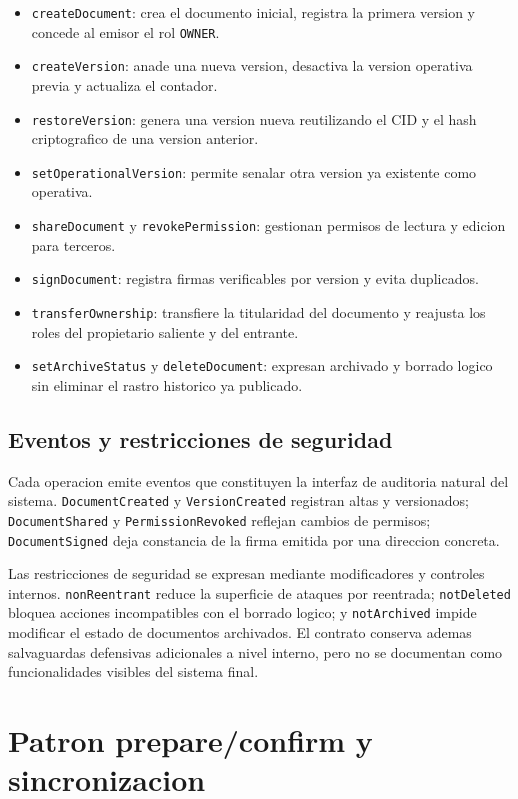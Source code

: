 \documentclass[11pt, a4paper]{article}
\begin{document}
\begin{itemize}
    \item \texttt{createDocument}: crea el documento inicial, registra la primera version y concede al emisor el rol \texttt{OWNER}.
    \item \texttt{createVersion}: anade una nueva version, desactiva la version operativa previa y actualiza el contador.
    \item \texttt{restoreVersion}: genera una version nueva reutilizando el CID y el hash criptografico de una version anterior.
    \item \texttt{setOperationalVersion}: permite senalar otra version ya existente como operativa.
    \item \texttt{shareDocument} y \texttt{revokePermission}: gestionan permisos de lectura y edicion para terceros.
    \item \texttt{signDocument}: registra firmas verificables por version y evita duplicados.
    \item \texttt{transferOwnership}: transfiere la titularidad del documento y reajusta los roles del propietario saliente y del entrante.
    \item \texttt{setArchiveStatus} y \texttt{deleteDocument}: expresan archivado y borrado logico sin eliminar el rastro historico ya publicado.
\end{itemize}

\subsection{Eventos y restricciones de seguridad}

Cada operacion emite eventos que constituyen la interfaz de auditoria natural del sistema. \texttt{DocumentCreated} y \texttt{VersionCreated} registran altas y versionados; \texttt{DocumentShared} y \texttt{PermissionRevoked} reflejan cambios de permisos; \texttt{DocumentSigned} deja constancia de la firma emitida por una direccion concreta.

Las restricciones de seguridad se expresan mediante modificadores y controles internos. \texttt{nonReentrant} reduce la superficie de ataques por reentrada; \texttt{notDeleted} bloquea acciones incompatibles con el borrado logico; y \texttt{notArchived} impide modificar el estado de documentos archivados. El contrato conserva ademas salvaguardas defensivas adicionales a nivel interno, pero no se documentan como funcionalidades visibles del sistema final.

\section{Patron prepare/confirm y sincronizacion}
\end{document}
